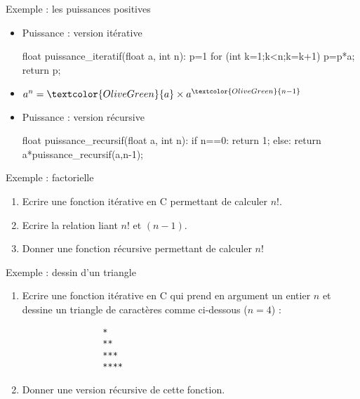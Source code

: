 \documentclass[10pt]{beamer}
\begin{document}
\begin{frame}[fragile]{\Ctitle}{\stitle}
	\begin{exampleblock}{Exemple : les puissances positives}
		\begin{itemize}
			\item<1-> \textcolor{OliveGreen}{Puissance : version itérative}
\begin{langageC}
float puissance_iteratif(float a, int n):
    p=1
    for (int k=1;k<n;k=k+1){
        p=p*a;}
    return p;
\end{langageC}
			\item<2-> $a^n = \textcolor{OliveGreen}{a} \times a^{\textcolor{OliveGreen}{n-1}}$
			\item<3-> \textcolor{OliveGreen}{Puissance : version récursive}
			      \begin{langageC}
float puissance_recursif(float a, int n):
    if n==0:
        return 1;
    else:
        return a*puissance_recursif(a,n-1);
\end{langageC}
		\end{itemize}
	\end{exampleblock}
\end{frame}


\begin{frame}[fragile]{\Ctitle}{\stitle}
    \begin{exampleblock}{Exemple : factorielle}
        \begin{enumerate}
            \item<1-> Ecrire une fonction itérative en C permettant de calculer $n!$.
            \item<2-> Ecrire la relation liant $n!$ et $(n-1)$.
            \item<3-> Donner une fonction récursive permettant de calculer $n!$
        \end{enumerate}
    \end{exampleblock}
    \begin{exampleblock}{Exemple : dessin d'un triangle}
        \begin{enumerate}
            \item<4-> Ecrire une fonction itérative en C qui prend en argument un entier $n$ et dessine un triangle de caractères {\tt *}comme ci-dessous ($n=4$) :\begin{verbatim}
                *
                ** 
                *** 
                ****
            \end{verbatim}
            \item<5-> Donner une version récursive de cette fonction.
        \end{enumerate}
    \end{exampleblock}
\end{frame}
\end{document}
